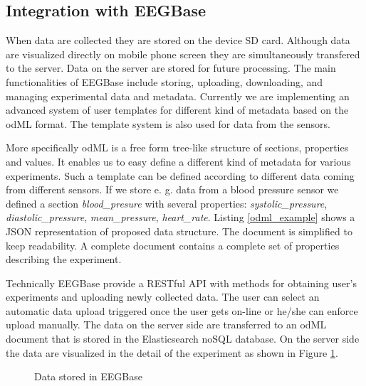 \documentclass[a4paper,twoside]{article}
\begin{document}
\subsection{Integration with EEGBase}

When data are collected they are stored on the device SD card. Although data are visualized directly on mobile phone screen they are simultaneously transfered to the server. Data on the server are stored for future processing. The main functionalities of EEGBase include storing, uploading, downloading, and managing experimental data and metadata. Currently we are implementing an advanced system of user templates for different kind of metadata based on the odML format. The template system is also used for data from the sensors. 

More specifically odML is  a free form tree-like structure of sections, properties and values. It enables us to easy define a different kind of metadata for various experiments. Such a template can be defined according to different data coming from different sensors. If we store e. g. data from a blood pressure sensor we  defined a section \emph{blood\_presure} with several properties: \textit{systolic\_pressure}, \textit{diastolic\_pressure}, \textit{mean\_pressure}, \textit{heart\_rate}. Listing \ref{odml_example} shows a JSON representation of proposed data structure. The document is simplified to keep readability. A complete document contains a complete set of properties describing the experiment.

Technically EEGBase provide a RESTful API with methods for obtaining user's experiments and uploading newly collected data. The user can select an automatic data upload triggered once the user gets on-line or he/she can enforce upload manually. The data on the server side are transferred to an odML document that is stored in the Elasticsearch noSQL database. On the server side the data are visualized in the detail of the experiment as shown in Figure \ref{fig:EEGBase}.


\begin{figure}

  \centering
   {}
  \caption{Data stored in EEGBase}
  \label{fig:EEGBase}
 \end{figure}
\end{document}
